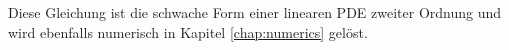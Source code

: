 \documentclass{mythesis}
\begin{document}
Diese Gleichung ist die schwache Form einer linearen PDE zweiter Ordnung und wird ebenfalls numerisch in Kapitel \ref{chap:numerics} gelöst.












%
%
\end{document}
